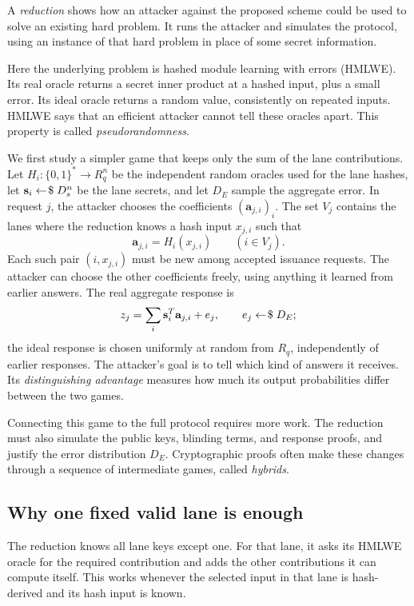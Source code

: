 \documentclass[10pt]{article}
\newcommand{\sample}{\mathrel{\leftarrow\joinrel\$}}
\begin{document}
A \emph{reduction} shows how an attacker against the proposed scheme could
be used to solve an existing hard problem.  It runs the attacker and
simulates the protocol, using an instance of that hard problem in place of
some secret information.

Here the underlying problem is hashed module learning with errors (HMLWE).
Its real oracle returns a secret inner product at a hashed input, plus a
small error.  Its ideal oracle returns a random value, consistently on
repeated inputs.  HMLWE says that an efficient attacker cannot tell these
oracles apart.  This property is called \emph{pseudorandomness}.

We first study a simpler game that keeps only the sum of the lane
contributions.  Let $H_i:\{0,1\}^*\rightarrow R_q^n$ be the independent
random oracles used for the lane hashes, let $\mathbf s_i\sample D_s^n$ be
the lane secrets, and let $D_E$ sample the aggregate error.  In request $j$,
the attacker chooses the coefficients $(\mathbf a_{j,i})_i$.  The set $V_j$
contains the lanes where the reduction knows a hash input $x_{j,i}$ such that
\[
 \mathbf a_{j,i}=H_i(x_{j,i})\qquad(i\in V_j).
\]
Each such pair $(i,x_{j,i})$ must be new among accepted issuance requests.
The attacker can choose the other coefficients freely, using anything it
learned from earlier answers.  The real aggregate response is
\[
 z_j=\sum_i\mathbf s_i^T\mathbf a_{j,i}+e_j,
 \qquad e_j\sample D_E;
\]
the ideal response is chosen uniformly at random from $R_q$, independently
of earlier responses.  The attacker's goal is to tell which kind of answers
it receives.  Its \emph{distinguishing advantage} measures how much its
output probabilities differ between the two games.

Connecting this game to the full protocol requires more work.  The reduction
must also simulate the public keys, blinding terms, and response proofs, and
justify the error distribution $D_E$.  Cryptographic proofs often make these
changes through a sequence of intermediate games, called \emph{hybrids}.

\subsection{Why one fixed valid lane is enough}\label{sec:fixed-lane}

The reduction knows all lane keys except one.  For that lane, it asks its
HMLWE oracle for the required contribution and adds the other contributions
it can compute itself.  This works whenever the selected input in that lane
is hash-derived and its hash input is known.
\end{document}
